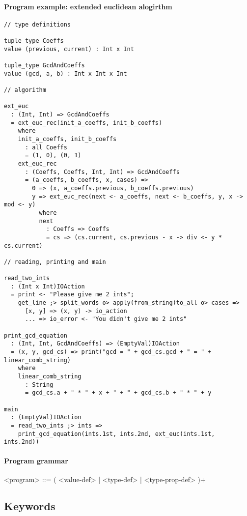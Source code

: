 \documentclass{article}
\begin{document}
\paragraph{Program example: extended euclidean alogirthm}
\begin{verbatim}
// type definitions

tuple_type Coeffs
value (previous, current) : Int x Int

tuple_type GcdAndCoeffs
value (gcd, a, b) : Int x Int x Int

// algorithm

ext_euc
  : (Int, Int) => GcdAndCoeffs
  = ext_euc_rec(init_a_coeffs, init_b_coeffs)
    where
    init_a_coeffs, init_b_coeffs
      : all Coeffs
      = (1, 0), (0, 1)
    ext_euc_rec
      : (Coeffs, Coeffs, Int, Int) => GcdAndCoeffs
      = (a_coeffs, b_coeffs, x, cases) =>
        0 => (x, a_coeffs.previous, b_coeffs.previous)
        y => ext_euc_rec(next <- a_coeffs, next <- b_coeffs, y, x -> mod <- y)
          where
          next
            : Coeffs => Coeffs
            = cs => (cs.current, cs.previous - x -> div <- y * cs.current)

// reading, printing and main

read_two_ints
  : (Int x Int)IOAction
  = print <- "Please give me 2 ints";
    get_line ;> split_words o> apply(from_string)to_all o> cases =>
      [x, y] => (x, y) -> io_action
      ... => io_error <- "You didn't give me 2 ints"
 
print_gcd_equation
  : (Int, Int, GcdAndCoeffs) => (EmptyVal)IOAction
  = (x, y, gcd_cs) => print("gcd = " + gcd_cs.gcd + " = " + linear_comb_string)
    where
    linear_comb_string
      : String
      = gcd_cs.a + " * " + x + " + " + gcd_cs.b + " * " + y

main
  : (EmptyVal)IOAction
  = read_two_ints ;> ints =>
    print_gcd_equation(ints.1st, ints.2nd, ext_euc(ints.1st, ints.2nd))
\end{verbatim}

\paragraph{Program grammar}
\begin{grammar}
<program> ::= ( <value-def> | <type-def> | <type-prop-def> )+
\end{grammar}

\subsection{Keywords}
\end{document}

